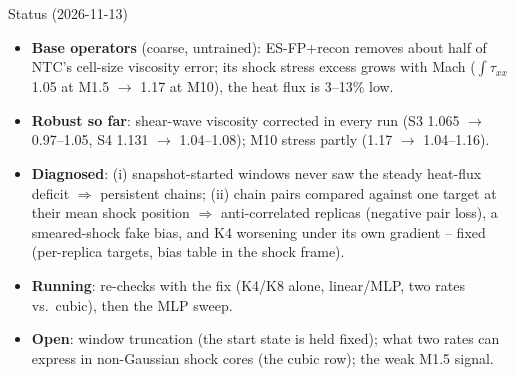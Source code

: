 \documentclass[10pt,aspectratio=169]{beamer}
\begin{document}
\begin{frame}{Status (2026-11-13)}
\small
\begin{itemize}\setlength{\itemsep}{3pt}
\item \textbf{Base operators} (coarse, untrained): ES-FP+recon removes about half of NTC's
  cell-size viscosity error; its shock stress excess grows with Mach
  ($\int\tau_{xx}$ 1.05 at M1.5 $\to$ 1.17 at M10), the heat flux is 3--13\% low.
\item \textbf{Robust so far}: shear-wave viscosity corrected in every run
  (S3 1.065 $\to$ 0.97--1.05, S4 1.131 $\to$ 1.04--1.08); M10 stress partly (1.17 $\to$ 1.04--1.16).
\item \textbf{Diagnosed}: (i) snapshot-started windows never saw the steady heat-flux deficit
  $\Rightarrow$ persistent chains; (ii) chain pairs compared against one target at their mean
  shock position $\Rightarrow$ anti-correlated replicas (negative pair loss), a smeared-shock
  fake bias, and K4 worsening under its own gradient -- fixed (per-replica targets,
  bias table in the shock frame).
\item \textbf{Running}: re-checks with the fix (K4/K8 alone, linear/MLP, two rates vs.\ cubic),
  then the MLP sweep.
\item \textbf{Open}: window truncation (the start state is held fixed); what two rates can express
  in non-Gaussian shock cores (the cubic row); the weak M1.5 signal.
\end{itemize}
\end{frame}
\end{document}
